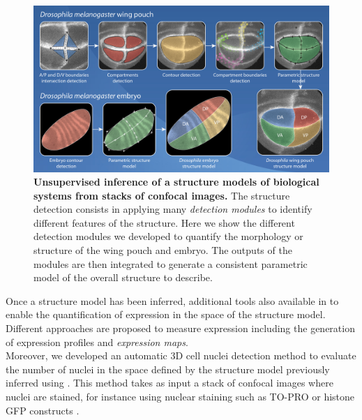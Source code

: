 \begin{figure}[!h]
\centering
\includegraphics[width=146mm]{images/generic-diagram_300dpi.jpg} %
\caption{\textbf{Unsupervised inference of a structure models of biological systems from stacks of confocal images.} The structure detection consists in applying many \textit{detection modules} to identify different features of the structure. Here we show the different detection modules we developed to quantify the morphology or structure of the \droso wing pouch and \droso embryo. The outputs of the modules are then integrated to generate a consistent parametric model of the overall structure to describe.}
\label{fig:wingj_wpouch_detection_modules_intro}
\end{figure}

Once a structure model has been inferred, additional tools also available in \wingj to enable the quantification of expression in the space of the structure model. Different approaches are proposed to measure expression including the generation of expression profiles and \textit{expression maps}.\\

Moreover, we developed an automatic 3D cell nuclei detection method to evaluate the number of nuclei in the space defined by the structure model previously inferred using \wingj. This method takes as input a stack of confocal images where nuclei are stained, for instance using nuclear staining such as TO-PRO \autocite{suzuki1997dna} or histone GFP constructs \autocite{kanda1998histone}.\\

